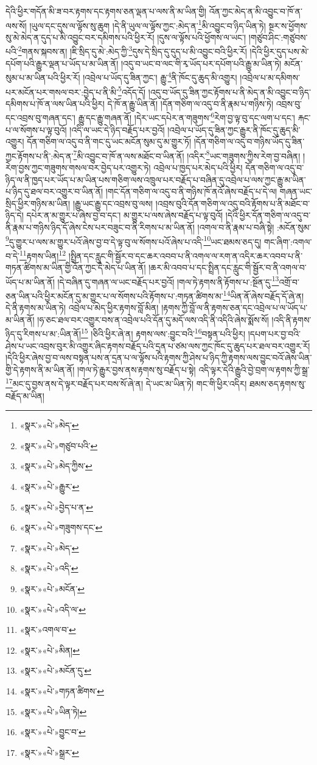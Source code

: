 དེའི་ཕྱིར་གདོན་མི་ཟ་བར་རྟགས་དང་རྟགས་ཅན་ལྡན་པ་ལས་ནི་མ་ཡིན་གྱི། འོན་ཀྱང་མེད་ན་མི་འབྱུང་བ་ཁོ་ན་ལས་སོ། །ཡུལ་དང་དུས་ལ་ལྟོས་སུ་ཆུག །དེ་ནི་ཡུལ་ལ་ལྟོས་ཀྱང་:མེད་ན་\footnote{«སྣར་»«པེ་»མེད་}མི་འབྱུང་བ་ཉིད་ཡིན་ཏེ། སྔར་ས་ཕྱོགས་སུ་མེ་མེད་ན་དུད་པ་མི་འབྱུང་བར་དམིགས་པའི་ཕྱིར་རོ། །དུས་ལ་ལྟོས་པའི་ཕྱོགས་ལ་ཡང་། །གཙུབ་ཤིང་:གཙུབས་པའི་\footnote{«སྣར་»«པེ་»གཙུབ་པའི་}གནས་སྐབས་ན། །ཇི་སྲིད་དུ་མེ་:མེད་ཀྱི་\footnote{«སྣར་»«པེ་»མེད་ཀྱིས་}དུས་དེ་སྲིད་དུ་དུད་པ་མི་འབྱུང་བའི་ཕྱིར་རོ། །དེའི་ཕྱིར་དུད་པས་མེ་དཔོག་པའི་རྒྱུར་ལྡན་པ་ཡོད་པ་མ་ཡིན་ནོ། །འདུ་བ་ཡང་བ་ལང་གི་རྭ་ཡོད་པར་དཔོག་པའི་རྒྱུ་མ་ཡིན་ཏེ། མངོན་སུམ་པ་མ་ཡིན་པའི་ཕྱིར་རོ། །འབྲེལ་པ་ཡོད་དུ་ཟིན་ཀྱང་། རྒྱུ་\footnote{«སྣར་»«པེ་»རྒྱུར་}ནི་ཁོང་དུ་ཆུད་མི་འགྱུར། །འབྲེལ་པ་མ་དམིགས་པར་མངོན་པར་གསལ་བར་:བྱེད་པ་ནི་མི་\footnote{«སྣར་»«པེ་»བྱེད་པ་ན་}འདོད་དོ། །འདུ་བ་ཡོད་དུ་ཟིན་ཀྱང་རྟོགས་པ་ནི་མེད་ན་མི་འབྱུང་བ་ཉིད་དམིགས་པ་ཁོ་ན་ལས་ཡིན་པའི་ཕྱིར། དེ་ཁོ་ན་རྒྱུ་ཡིན་ནོ། །དོན་གཅིག་ལ་འདུ་བ་ནི་རྣམ་པ་གཉིས་ཏེ། འབྲས་བུ་དང་འབྲས་བུ་གཞན་དང་། རྒྱུ་དང་རྒྱུ་གཞན་ནོ། །དེར་ཡང་དཔེར་ན་གཟུགས་\footnote{«སྣར་»«པེ་»གཟུགས་དང་}རེག་བྱ་ལྟ་བུ་དང་ལག་པ་དང་། རྐང་པ་ལ་སོགས་པ་ལྟ་བུའོ། །འདི་ལ་ཡང་དེ་ཉིད་བརྗོད་པར་བྱའོ། །འབྲེལ་པ་ཡོད་དུ་ཟིན་ཀྱང་རྒྱུར་ནི་ཁོང་དུ་ཆུད་མི་འགྱུར། དོན་གཅིག་ལ་འདུ་བ་ནི་གང་དུ་ཡང་མངོན་སུམ་དུ་མ་གྱུར་ཏོ། །དོན་གཅིག་ལ་འདུ་བ་གཉིས་ཡོད་དུ་ཟིན་ཀྱང་རྟོགས་པ་ནི་:མེད་ན་\footnote{«སྣར་»«པེ་»མེད་}མི་འབྱུང་བ་ཁོ་ན་ལས་མཐོང་བ་ཡིན་ནོ། །འདིར་\footnote{«སྣར་»«པེ་»འདི་}ཡང་གཟུགས་ཀྱིས་རེག་བྱ་བཞིན། །རེག་བྱས་ཀྱང་གཟུགས་གསལ་བར་བྱེད་པར་འགྱུར་ཏེ། འབྲེལ་པ་ཁྱད་པར་མེད་པའི་ཕྱིར། དོན་གཅིག་ལ་འདུ་བ་ཉིད་ལ་ནི་ཁྱད་པར་ཡོད་པ་མ་ཡིན་པས་གཅིག་ལས་འཁྲུལ་པར་བརྗོད་པ་བཞིན་དུ་འབྲེལ་པ་ལས་ཀྱང་རྒྱུ་མ་ཡིན་པ་ཉིད་དུ་ཐལ་བར་འགྱུར་བ་ཡིན་ནོ། །གང་དོན་གཅིག་ལ་འདུ་བ་ནི་གཉིས་ཁོ་ནའོ་ཞེས་བརྗོད་པ་དེ་ལ། གཞན་ཡང་སྲིད་ཕྱིར་གཉིས་མ་ཡིན། །རྒྱུ་ཡང་རྒྱུ་དང་འབྲས་བུ་ལས། །འབྲས་བུའི་དོན་གཅིག་ལ་འདུ་བའི་རྟོགས་པ་ནི་མཐོང་བ་ཉིད་དེ། དཔེར་ན་མ་གྱུར་པ་ཞེས་བྱ་བ་དང་། མ་གྱུར་པ་ལས་ཞེས་བརྗོད་པ་ལྟ་བུའོ། །དེའི་ཕྱིར་དོན་གཅིག་ལ་འདུ་བ་ནི་རྣམ་པ་གཉིས་ཉིད་དོ་ཞེས་ངེས་པར་བཟུང་བ་ནི་རིགས་པ་མ་ཡིན་ནོ། །འགལ་བ་ནི་རྣམ་པ་བཞི་སྟེ། :མངོན་སུམ་\footnote{«སྣར་»«པེ་»མངོན་}དུ་གྱུར་པ་ལས་མ་གྱུར་པའོ་ཞེས་བྱ་བ་དེ་ལྟ་བུ་ལ་སོགས་པའོ་ཞེས་པ་འདི་\footnote{«སྣར་»«པེ་»འདི་ལ་}ཡང་ཐམས་ཅད་དུ། གང་ཞིག་:འགལ་བ་དེ་\footnote{«སྣར་»འགལ་བ་}རྟགས་ཡིན།\footnote{«སྣར་»«པེ་»མིན།} །སྤྲིན་དང་རླུང་གི་སྦྱོར་བ་དང་ཆར་འབབ་པ་ནི་འགལ་ལ་རག་ན་འདིར་ཆར་འབབ་པ་ནི་གཏན་ཚིགས་མ་ཡིན་གྱི་འོན་ཀྱང་དེ་མེད་པ་ཡིན་ནོ། །ཆར་མི་འབབ་པ་དང་སྤྲིན་དང་རླུང་གི་སྦྱོར་བ་ནི་འགལ་བ་ཡོད་པ་མ་ཡིན་ནོ། །དེ་བཞིན་དུ་གཞན་ལ་ཡང་བརྗོད་པར་བྱའོ། །གལ་ཏེ་རྟགས་ནི་རྟོགས་པ་:སྔོན་དུ་\footnote{«སྣར་»«པེ་»མངོན་དུ་}འགྲོ་བ་ཅན་ཡིན་པའི་ཕྱིར་མངོན་དུ་མ་གྱུར་པ་ལ་སོགས་པའི་རྟོགས་པ་:གཏན་ཚིགས་མ་\footnote{«སྣར་»«པེ་»གཏན་ཚིགས་}ཡིན་ནོ་ཞེས་བརྗོད་དོ་ཞེ་ན། དེ་ནི་རྟགས་མ་ཡིན་ཏེ། འབྲེལ་པ་མེད་ཕྱིར་རྟགས་བློ་མིན། །རྟགས་ཀྱི་བློ་ལ་ནི་རྟགས་ཅན་དང་འབྲེལ་པ་ལ་ཡོད་པ་མ་ཡིན་ནོ། །ཧ་ཅང་ཐལ་བར་འགྱུར་བས་ན་འབྲེལ་པའི་དོན་དུ་མདོ་ལས་འདི་ནི་འདིའི་ཞེས་སྨོས་སོ། །འདི་ནི་རྟགས་ཉིད་དུ་རིགས་པ་མ་:ཡིན་ནོ།\footnote{«སྣར་»«པེ་»ཡིན་ཏེ།} །ཅིའི་ཕྱིར་ཞེ་ན། རྟགས་ལས་:བྱུང་བའི་\footnote{«སྣར་»«པེ་»བྱུང་བ་}བསྟན་པའི་ཕྱིར། །དཔག་པར་བྱ་བའི་ཤེས་པ་ཡང་འབྲས་བུར་མི་འགྱུར་ཞིང་རྟགས་བརྗོད་པའི་དྲན་པ་ཙམ་ལས་ཀྱང་ཁོང་དུ་ཆུད་པར་ཐལ་བར་འགྱུར་རོ། །དེའི་ཕྱིར་ཞེས་བྱ་བ་ལས་བསྟན་པས་ན་དྲན་པ་ལ་ལྟོས་པའི་རྟགས་ཀྱི་ཤེས་པ་ཉིད་ཀྱི་རྟགས་ལས་བྱུང་བའོ་ཞེས་ཡིན་གྱི་དེ་རྟགས་ནི་མ་ཡིན་ནོ། །གལ་ཏེ་རྒྱུར་བྱས་ནས་རྟགས་སུ་བརྗོད་པ་སྟེ། འདི་ལྟར་དེའི་རྒྱུའི་བྱེ་བྲག་ལ་རྟགས་ཀྱི་སྒྲ་\footnote{«སྣར་»«པེ་»སྒྲར་}མང་དུ་བྱས་ནས་དེ་ལྟར་བརྗོད་པར་བས་སོ་ཞེ་ན། དེ་ཡང་མ་ཡིན་ཏེ། གང་གི་ཕྱིར་འདིར། ཐམས་ཅད་རྟགས་སུ་བརྗོད་མ་ཡིན། 